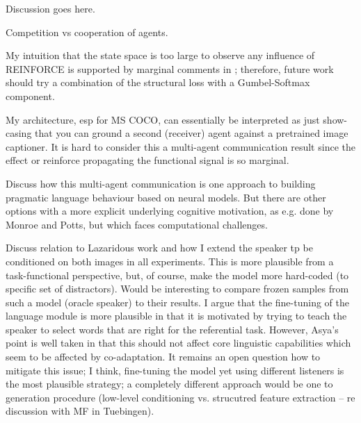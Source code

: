 Discussion goes here. 

Competition vs cooperation of agents. 

My intuition that the state space is too large to observe any influence of REINFORCE is supported by marginal comments in \cite{havrylov2017emergence}; therefore, future work should try a combination of the structural loss with a Gumbel-Softmax component.

My architecture, esp for MS COCO, can essentially be interpreted as just show-casing that you can ground a second (receiver) agent against a pretrained image captioner. It is hard to consider this a multi-agent communication result since the effect or reinforce propagating the functional signal is so marginal. 

Discuss how this multi-agent communication is one approach to building pragmatic language behaviour based on neural models. But there are other options with a more explicit underlying cognitive motivation, as e.g. done by Monroe and Potts, but which faces computational challenges. 

Discuss relation to Lazaridous work and how I extend the speaker tp be conditioned on both images in all experiments. This is more plausible from a task-functional perspective, but, of course, make the model more hard-coded (to specific set of distractors). Would be interesting to compare frozen samples from such a model (oracle speaker) to their results. I argue that the fine-tuning of the language module is more plausible in that it is motivated by trying to teach the speaker to select words that are right for the referential task. However, Asya's point is well taken in that this should not affect core linguistic capabilities which seem to be affected by co-adaptation. It remains an open question how to mitigate this issue; I think, fine-tuning the model yet using different listeners is the most plausible strategy; a completely different approach would be one to generation procedure (low-level conditioning vs. strucutred feature extraction -- re discussion with MF in Tuebingen). 